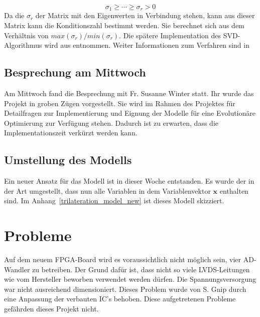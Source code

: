 \documentclass[a4paper,12pt,fleqn]{article}
\begin{document}
\begin{equation}
\sigma_1\geq\cdots\geq\sigma_r> 0
\end{equation}
%
Da die $\sigma_r$ der Matrix mit den Eigenwerten in Verbindung stehen, kann aus dieser Matrix kann die Konditionszahl bestimmt werden. Sie berechnet sich aus dem Verhältnis von $ max(\sigma_r) / min(\sigma_r) $. 
Die spätere Implementation des SVD-Algorithmus wird aus \cite{press2007numerical} entnommen. Weiter Informationen zum Verfahren sind in \cite[Kaptiel 4.6.3]{bronstejn2012taschenbuch}
%
\subsection{Besprechung am Mittwoch}
Am Mittwoch fand die Besprechung mit Fr. Susanne Winter statt. Ihr wurde das Projekt in groben Zügen vorgestellt. Sie wird im Rahmen des Projektes für Detailfragen zur Implementierung und Eignung der Modelle für eine Evolutionäre Optimierung zur Verfügung stehen. Dadurch ist zu erwarten, dass die Implementationszeit verkürzt werden kann.
%
\subsection{Umstellung des Modells}
%
Ein neuer Ansatz für das Modell ist in dieser Woche entstanden. Es wurde der in der Art umgestellt, dass nun alle Variablen in dem Variablenvektor $\mathbf{x}$ enthalten sind. Im Anhang~\ref{trilateration_model_new} ist dieses Modell skizziert.
%
\section{Probleme}
\label{Problems}
Auf dem neuem FPGA-Board wird es voraussichtlich nicht möglich sein, vier AD-Wandler zu betreiben. Der Grund dafür ist, dass nicht so viele LVDS-Leitungen wie vom Hersteller beworben verwendet werden dürfen. Die Spannungsversorgung war nicht ausreichend dimensioniert. Dieses Problem wurde von S. Gnip durch eine Anpassung der verbauten IC's behoben. Diese aufgetretenen Probleme gefährden dieses Projekt nicht.
%


\newpage


\end{document}
